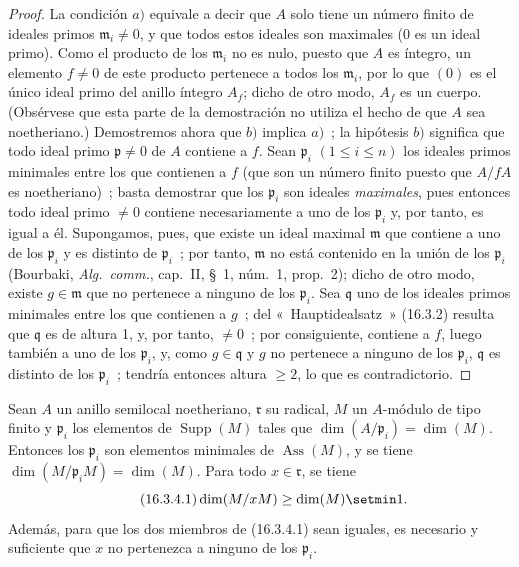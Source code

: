 \begin{proof}
La condición $a)$ equivale a decir que $A$ solo tiene un número finito de
ideales primos $\mathfrak{m}_i\neq0$, y que todos estos ideales son maximales
($0$ es un ideal primo). Como el producto de los $\mathfrak{m}_i$ no es nulo,
puesto que $A$ es íntegro, un elemento $f\neq0$ de este producto pertenece a
todos los $\mathfrak{m}_i$, por lo que $(0)$ es el único ideal primo del anillo
íntegro $A_f$; dicho de otro modo, $A_f$ es un cuerpo. (Obsérvese que esta
parte de la demostración no utiliza el hecho de que $A$ sea noetheriano.)
Demostremos ahora que $b)$ implica $a)$~; la hipótesis $b)$ significa que todo
ideal primo $\mathfrak{p}\neq0$ de $A$ contiene a $f$. Sean $\mathfrak{p}_i$
$(1\leq i\leq n)$ los ideales primos minimales entre los que contienen a $f$
(que son un número finito puesto que $A/fA$ es noetheriano)~; basta demostrar
que los $\mathfrak{p}_i$ son ideales \emph{maximales}, pues entonces todo ideal
primo $\neq0$ contiene necesariamente a uno de los $\mathfrak{p}_i$ y, por
tanto, es igual a él. Supongamos, pues, que existe un ideal maximal
$\mathfrak{m}$ que contiene a uno de los $\mathfrak{p}_i$ y es distinto de
$\mathfrak{p}_i$~; por tanto, $\mathfrak{m}$ no está contenido en la unión de
los $\mathfrak{p}_i$ (Bourbaki, \emph{Alg.~comm.}, cap.~II, \S~1, núm.~1,
prop.~2); dicho de otro modo, existe $g\in\mathfrak{m}$ que no pertenece a
ninguno de los $\mathfrak{p}_i$. Sea $\mathfrak{q}$ uno de los ideales primos
minimales entre los que contienen a $g$~; del «~Hauptidealsatz~» (16.3.2)
resulta que $\mathfrak{q}$ es de altura 1, y, por tanto, $\neq0$~; por
consiguiente, contiene a $f$, luego también a uno de los $\mathfrak{p}_i$, y,
como $g\in\mathfrak{q}$ y $g$ no pertenece a ninguno de los
$\mathfrak{p}_i$, $\mathfrak{q}$ es distinto de los $\mathfrak{p}_i$~; tendría
entonces altura $\geq2$, lo que es contradictorio.
\end{proof}

\begin{proposition}[16.3.4]
\label{0.16.3.4-es}
Sean $A$ un anillo semilocal noetheriano, $\mathfrak{r}$ su radical, $M$ un
$A$-módulo de tipo finito y $\mathfrak{p}_i$ los elementos de
$\operatorname{Supp}(M)$ tales que
$\dim(A/\mathfrak{p}_i)=\dim(M)$. Entonces los $\mathfrak{p}_i$ son elementos
minimales de $\operatorname{Ass}(M)$, y se tiene
$\dim(M/\mathfrak{p}_iM)=\dim(M)$. Para todo $x\in\mathfrak{r}$, se tiene
\begin{equation}
\label{0.16.3.4.1-es}
\tag{16.3.4.1}
  \dim(M/xM)\geq\dim(M)\setmin 1.
\end{equation}
Además, para que los dos miembros de \textup{(16.3.4.1)} sean iguales, es necesario y
suficiente que $x$ no pertenezca a ninguno de los $\mathfrak{p}_i$.
\end{proposition}


